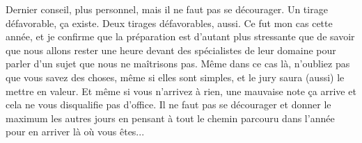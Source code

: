   \newpar
  Dernier conseil, plus personnel, mais il ne faut pas se décourager. Un tirage défavorable, ça existe. Deux tirages défavorables, aussi. Ce fut mon cas cette année, et je confirme que la préparation est d'autant plus stressante que de savoir que nous allons rester une heure devant des spécialistes de leur domaine pour parler d'un sujet que nous ne maîtrisons pas. Même dans ce cas là, n'oubliez pas que vous savez des choses, même si elles sont simples, et le jury saura (aussi) le mettre en valeur. Et même si vous n'arrivez à rien, une mauvaise note ça arrive et cela ne vous disqualifie pas d'office. Il ne faut pas se décourager et donner le maximum les autres jours en pensant à tout le chemin parcouru dans l'année pour en arriver là où vous êtes...

